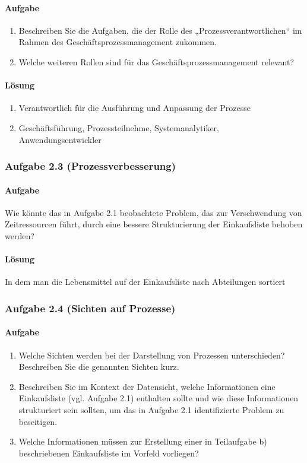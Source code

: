 \paragraph*{Aufgabe}
    \begin{enumerate}[label=\alph*)]
        \item Beschreiben Sie die Aufgaben, die der Rolle des „Prozessverantwortlichen“ im Rahmen des Geschäftsprozessmanagement zukommen.
        \item Welche weiteren Rollen sind für das Geschäftsprozessmanagement relevant?
    \end{enumerate}
   
\paragraph*{Lösung}
    \begin{enumerate}[label=\alph*)]
        \item Verantwortlich für die Ausführung und Anpassung der Prozesse
        \item Geschäftsführung, Prozessteilnehme, Systemanalytiker, Anwendungsentwickler
    \end{enumerate}

\subsubsection*{Aufgabe 2.3 (Prozessverbesserung)}
\paragraph*{Aufgabe}
    Wie könnte das in Aufgabe 2.1 beobachtete Problem, das zur Verschwendung von Zeitressourcen führt, durch eine bessere Strukturierung der Einkaufsliste behoben werden?
   
\paragraph*{Lösung}
    In dem man die Lebensmittel auf der Einkaufsliste nach Abteilungen sortiert

\subsubsection*{Aufgabe 2.4 (Sichten auf Prozesse)}
\paragraph*{Aufgabe}
    \begin{enumerate}[label=\alph*)]
        \item Welche Sichten werden bei der Darstellung von Prozessen unterschieden? Beschreiben Sie die genannten Sichten kurz.
        \item Beschreiben Sie im Kontext der Datensicht, welche Informationen eine Einkaufsliste (vgl. Aufgabe 2.1) enthalten sollte und wie diese Informationen strukturiert sein sollten, um das in Aufgabe 2.1 identifizierte Problem zu beseitigen.
        \item Welche Informationen müssen zur Erstellung einer in Teilaufgabe b) beschriebenen Einkaufsliste im Vorfeld vorliegen?
    \end{enumerate}
   
